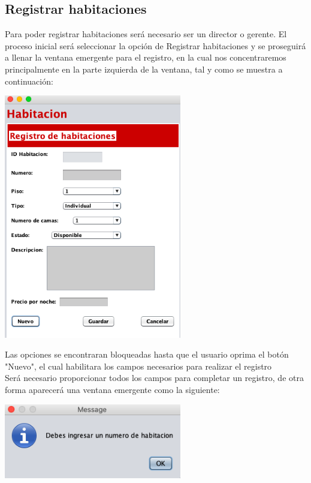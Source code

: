 \documentclass[12pt]{article}
\begin{document}
\begin{flushleft}
\section{Registrar habitaciones}
\textsf{Para poder registrar habitaciones será necesario ser un director o gerente. El proceso inicial será seleccionar la opción de Registrar habitaciones y se proseguirá a llenar la ventana emergente para el registro, en la cual nos concentraremos principalmente en la parte izquierda de la ventana, tal y como se muestra a continuación: }
\vspace{0.5cm}
\begin{center}
\includegraphics[width=7.75cm]{1.png}
\end{center}
\vspace{0.5cm}
\textsf{Las opciones se encontraran bloqueadas hasta que el usuario oprima el botón "Nuevo", el cual habilitara los campos necesarios para realizar el registro\vspace{0.5cm} \\Será necesario proporcionar todos los campos para completar un registro, de otra forma aparecerá una ventana emergente como la siguiente: }
\vspace{0.5cm}
\begin{center}
\includegraphics[width=7.75cm]{2.png}

\end{center}
\end{flushleft}
\end{document}
